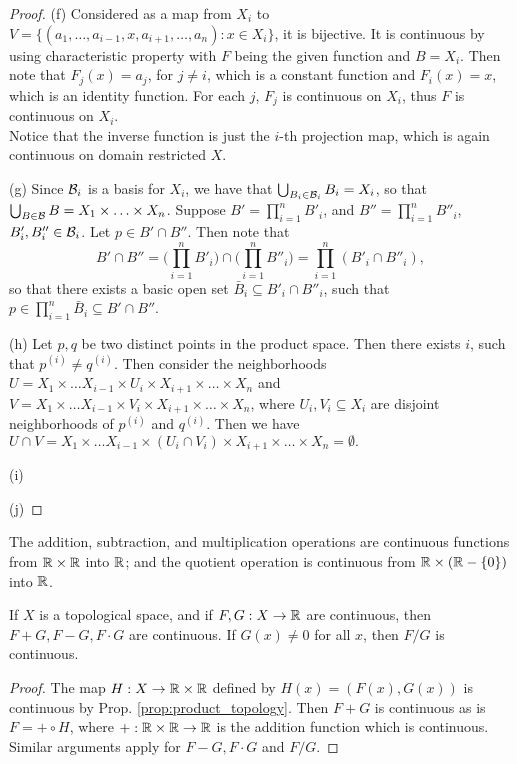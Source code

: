 \documentclass[11pt,a4paper]{article}
\begin{document}
\begin{proof}
(f) \forward Considered as a map from $X_i$ to $V = \{(a_1,\ldots,a_{i-1},x,a_{i+1},\ldots,a_n):x\in X_i\}$, it is bijective. It is continuous by using characteristic property with $F$ being the given function and $B = X_i$. Then note that $F_j(x) = a_j$, for $j\neq i$, which is a constant function and $F_i(x) = x$, which is an identity function. For each $j$, $F_j$ is continuous on $X_i$, thus $F$ is continuous on $X_i$.\\
\converse Notice that the inverse function is just the $i$-th projection map, which is again continuous on domain restricted $X$.

(g) Since $\mathcal{B}_i$ is a basis for $X_i$, we have that $\bigcup_{B_i\in\mathcal{B}_i}B_i = X_i$, so that $\bigcup_{B\in\mathcal{B}}B = X_1\times\ldots\times X_n$. Suppose $B' = \prod_{i=1}^n B'_i$, and $B'' = \prod_{i=1}^n B''_i$, $B'_i,B''_i\in\mathcal{B}_i$. Let $p\in B'\cap B''$. Then note that $$B'\cap B'' = \Big(\prod_{i=1}^n B'_i\Big)\cap \Big(\prod_{i=1}^n B''_i\Big) = \prod_{i=1}^n (B'_i\cap B''_i),$$
so that there exists a basic open set $\bar{B}_i\subseteq B'_i\cap B''_i$, such that $p\in \prod_{i=1}^n \bar{B}_i\subseteq B'\cap B''$.

(h) Let $p,q$ be two distinct points in the product space. Then there exists $i$, such that $p^{(i)}\neq q^{(i)}$. Then consider the neighborhoods $U = X_1\times\ldots X_{i-1}\times U_i \times X_{i+1}\times\ldots\times X_n$ and $V = X_1\times\ldots X_{i-1}\times V_i \times X_{i+1}\times\ldots\times X_n$, where $U_i,V_i\subseteq X_i$ are disjoint neighborhoods of $p^{(i)}$ and $q^{(i)}$. Then we have $U\cap V = X_1\times\ldots X_{i-1}\times (U_i\cap V_i) \times X_{i+1}\times\ldots\times X_n = \emptyset.$

(i) 

(j) 
\end{proof}

\begin{lemma}
The addition, subtraction, and multiplication operations are continuous functions from $\mathbb{R}\times \mathbb{R}$ into $\mathbb{R}$; and the quotient operation is continuous from $\mathbb{R}\times(\mathbb{R}-\{0\})$ into $\mathbb{R}$.
\end{lemma}

\begin{prop}
If $X$ is a topological space, and if $F,G:X\rightarrow \mathbb{R}$ are continuous, then $F+G,F-G,F\cdot G$ are continuous. If $G(x)\neq 0$ for all $x$, then $F/G$ is continuous.
\end{prop}

\begin{proof}
The map $H:X\rightarrow \mathbb{R}\times\mathbb{R}$ defined by $H(x) = (F(x),G(x))$ is continuous by Prop. \ref{prop:product_topology}. Then $F+G$ is continuous as  is $F = +\circ H$, where $+:\mathbb{R}\times \mathbb{R}\rightarrow \mathbb{R}$ is the addition function which is continuous. Similar arguments apply for $F-G,F\cdot G$ and $F/G$.
\end{proof}
\end{document}

